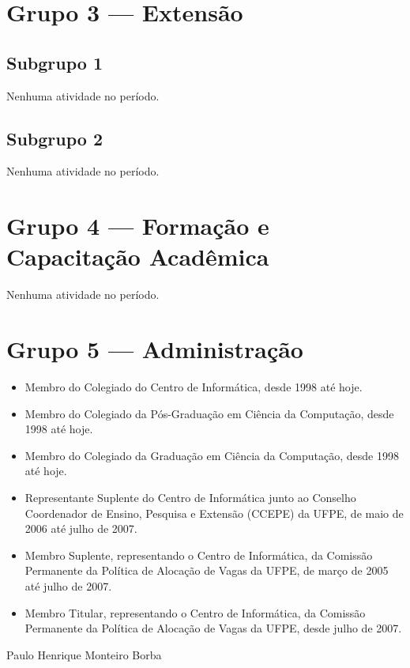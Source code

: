 \section{Grupo 3 --- Extensão}

\subsection{Subgrupo 1}

Nenhuma atividade no período.


\subsection{Subgrupo 2}

Nenhuma atividade no período.


\section{Grupo 4 --- Formação e Capacitação Acadêmica}

Nenhuma atividade no período.

\section{Grupo 5 --- Administração}

\begin{itemize}
\item Membro do Colegiado do Centro de Informática, desde 1998 até hoje. 
\item Membro do Colegiado da Pós-Graduação em Ciência da Computação, desde 1998 até hoje. 
\item Membro do Colegiado da Graduação em Ciência da Computação, desde 1998 até hoje. 
\item Representante Suplente do Centro de Informática junto ao Conselho Coordenador de Ensino, Pesquisa e Extensão (CCEPE) da UFPE, de maio de 2006 até julho de 2007.
\item Membro Suplente, representando o Centro de Informática, da Comissão Permanente da Política de Alocação de Vagas da UFPE, de março de 2005 até julho de 2007.
\item Membro Titular, representando o Centro de Informática, da Comissão Permanente da Política de Alocação de Vagas da UFPE, desde julho de 2007.
\end{itemize}
  
\vspace{2cm}
\begin{center}
Paulo Henrique Monteiro Borba
\end{center}


 